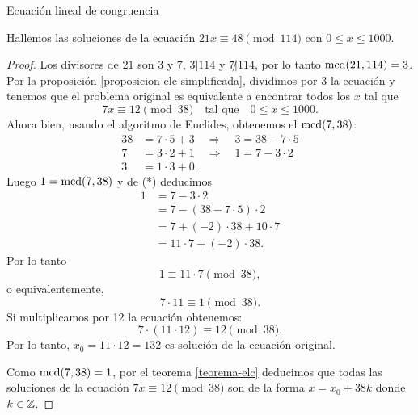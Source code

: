 \begin{section}{Ecuación lineal de congruencia}
\begin{ejemplo*} Hallemos las soluciones de la ecuación $21x\equiv
    48 \pmod{114}$ con $0 \le x \le 1000$.
    \end{ejemplo*}
    \begin{proof} Los divisores de $21$ son $3$ y $7$, $3|114$ y $7 \not| 114$, por lo tanto $\operatorname{mcd}(21, 114) = 3$. Por  la proposición \ref{proposicion-elc-simplificada}, dividimos por 3 la ecuación y tenemos que el problema original es equivalente a encontrar todos los $x$ tal que  
        \begin{equation*}
        7x \equiv  12 \pmod{38} \quad \text{tal que} \quad 0 \le x \le 1000.
        \end{equation*}
    Ahora bien, usando el algoritmo de Euclides, obtenemos el $\operatorname{mcd}(7,38)$:
    \begin{equation}
        \begin{aligned}
            38 &=  7 \cdot 5 + 3  \quad \Rightarrow \quad 3 = 38 - 7 \cdot 5\\
            7 &= 3 \cdot 2 + 1 \quad \Rightarrow \quad 1 = 7 - 3 \cdot 2\\
            3 &= 1 \cdot 3 + 0.
            \end{aligned}
            \tag{*}
    \end{equation}
    Luego $1 = \operatorname{mcd}(7,38)$ y de (*) deducimos 
    \begin{align*}
    1 &= 7 - 3 \cdot 2\\
    &= 7 - (38 - 7 \cdot 5) \cdot 2\\
    &= 7 + (-2) \cdot  38 + 10 \cdot  7\\
    &= 11 \cdot  7 + (-2) \cdot  38 .
    \end{align*}
    Por lo tanto 
    \begin{equation*}
        1 \equiv 11 \cdot  7 \pmod{38},
    \end{equation*}
    o equivalentemente, 
    \begin{equation*}
        7 \cdot  11  \equiv 1\pmod{38}. 
    \end{equation*}
    Si multiplicamos por 12 la ecuación obtenemos:
    \begin{equation*}
        7 \cdot  (11 \cdot 12)   \equiv 12 \pmod{38}. 
    \end{equation*}
    Por lo tanto, $x_0 =  11 \cdot 12 = 132$ es solución de la ecuación original. 

    Como $\operatorname{mcd}(7, 38) =1$, por el teorema \ref{teorema-elc} deducimos que todas las soluciones de la ecuación $7x \equiv  12 \pmod{38}$ son de la forma $x = x_0 + 38k $ donde $k \in {\mathbb Z}$.


\end{proof}
\end{section}
